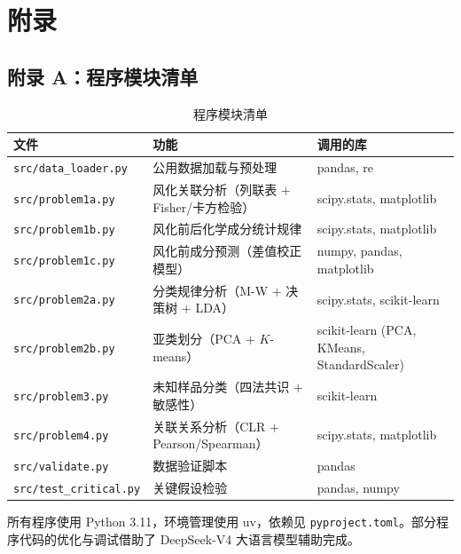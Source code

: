 \section*{附录}

\subsection*{附录 A：程序模块清单}

\begin{table}[H]
    \centering
    \caption{程序模块清单}
    \label{tab:modules}
    \begin{tabular}{p{4cm} p{5.5cm} p{4.5cm}}
        \toprule
        \textbf{文件} & \textbf{功能} & \textbf{调用的库} \\
        \midrule
        \texttt{src/data\_loader.py} & 公用数据加载与预处理 & pandas, re \\
        \texttt{src/problem1a.py} & 风化关联分析（列联表 $+$ Fisher/卡方检验） & scipy.stats, matplotlib \\
        \texttt{src/problem1b.py} & 风化前后化学成分统计规律 & scipy.stats, matplotlib \\
        \texttt{src/problem1c.py} & 风化前成分预测（差值校正模型） & numpy, pandas, matplotlib \\
        \texttt{src/problem2a.py} & 分类规律分析（M-W $+$ 决策树 $+$ LDA） & scipy.stats, scikit-learn \\
        \texttt{src/problem2b.py} & 亚类划分（PCA $+$ $K$-means） & scikit-learn (PCA, KMeans, StandardScaler) \\
        \texttt{src/problem3.py} & 未知样品分类（四法共识 $+$ 敏感性） & scikit-learn \\
        \texttt{src/problem4.py} & 关联关系分析（CLR $+$ Pearson/Spearman） & scipy.stats, matplotlib \\
        \texttt{src/validate.py} & 数据验证脚本 & pandas \\
        \texttt{src/test\_critical.py} & 关键假设检验 & pandas, numpy \\
        \bottomrule
    \end{tabular}
\end{table}

所有程序使用 Python 3.11，环境管理使用 uv，依赖见 \texttt{pyproject.toml}。部分程序代码的优化与调试借助了 DeepSeek-V4 大语言模型辅助完成。

